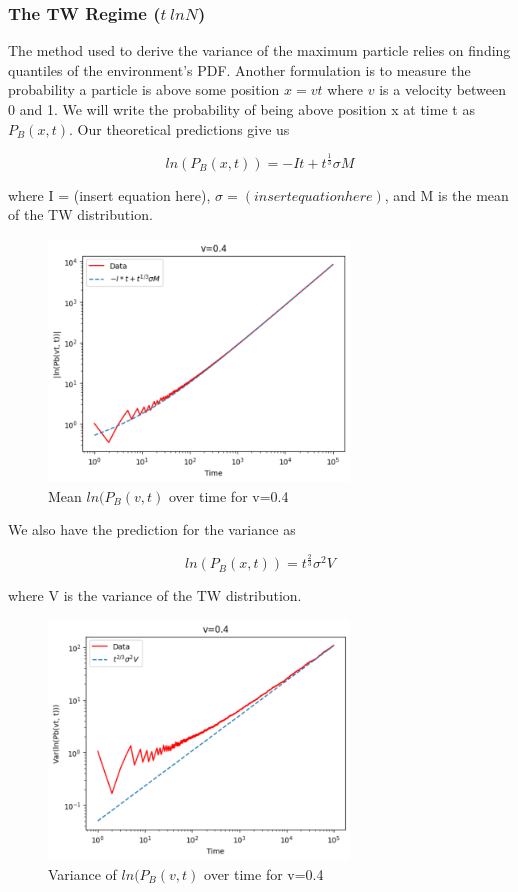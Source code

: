 \documentclass{article}
\begin{document}
\subsubsection{The TW Regime ($t~lnN$)}
\indent\indent The method used to derive the variance of the maximum particle relies on finding quantiles of the environment's PDF. Another formulation is to measure the probability a particle is above some position $x=vt$ where $v$ is a velocity between 0 and 1. We will write the probability of being above position x at time t as $P_{B}(x,t)$. Our theoretical predictions give us 

\begin{equation}
ln(P_{B}(x, t)) = -It + t^{\frac{1}{3}}\sigma M 
\end{equation}

where I = (insert equation here), $\sigma=(insert equation here)$, and M is the mean of the TW distribution. 

\begin{figure}[H]
\centering
\includegraphics[width=8cm]{Mean0_4}
\caption{Mean $ln(P_{B}(v, t)$ over time for v=0.4}
\label{fig:MeanVelocity}
\end{figure}

We also have the prediction for the variance as 

\begin{equation}
ln(P_{B}(x, t)) = t^{\frac{2}{3}}\sigma^{2}V
\end{equation}

where V is the variance of the TW distribution.

\begin{figure}[H]
\centering
\includegraphics[width=8cm]{Var0_4}
\caption{Variance of $ln(P_{B}(v, t)$ over time for v=0.4}
\label{fig:VarVelocity}
\end{figure}
\end{document}

